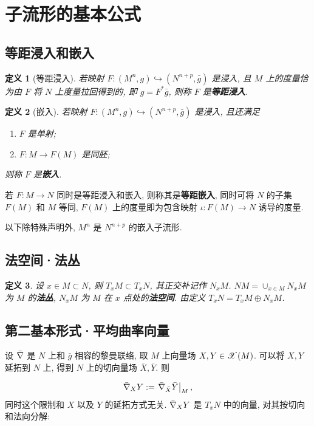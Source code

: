 \documentclass{ctexart}
\newtheorem{definition}{定义}
\begin{document}
\section{子流形的基本公式}
\subsection{等距浸入和嵌入}
\begin{definition}[等距浸入]
	若映射 $F\colon (M^n, g) \hookrightarrow (N^{n + p}, \bar{g})$ 是浸入, 且 $M$ 上的度量恰为由 $F$ 将 $N$ 上度量拉回得到的, 即 $g = F^{\ast}\bar{g}$, 则称 $F$ 是{\bf 等距浸入}.
\end{definition}

\begin{definition}[嵌入]
	若映射 $F\colon (M^n, g) \hookrightarrow (N^{n + p}, \bar{g})$ 是浸入, 且还满足
	\begin{enumerate}
		\item $F$ 是单射;
		\item $F\colon M \rightarrow F(M)$ 是同胚;
	\end{enumerate}
	则称 $F$ 是{\bf 嵌入}.
\end{definition}

若 $F \colon M \rightarrow N$ 同时是等距浸入和嵌入, 则称其是{\bf 等距嵌入}, 同时可将 $N$ 的子集 $F(M)$ 和 $M$ 等同, $F(M)$ 上的度量即为包含映射 $\iota \colon F(M) \rightarrow N$ 诱导的度量.

以下除特殊声明外, $M^n$ 是 $N^{n + p}$ 的嵌入子流形.

\subsection{法空间·法丛}
\begin{definition}
	设 $x \in M \subset N$, 则 $T_xM \subset T_xN$, 其正交补记作 $N_xM$. $NM = \cup_{x \in M}N_xM$ 为 $M$ 的{\bf 法丛}, $N_xM$ 为 $M$ 在 $x$ 点处的{\bf 法空间}. 由定义 $T_xN = T_x{M} \oplus N_xM$.
\end{definition}

\subsection{第二基本形式·平均曲率向量}
设 $\bar{\nabla}$ 是 $N$ 上和 $\bar{g}$ 相容的黎曼联络, 取 $M$ 上向量场 $X, Y \in \mathscr{X}(M)$. 可以将 $X, Y$ 延拓到 $N$ 上, 得到 $N$ 上的切向量场 $\bar{X}, \bar{Y}$. 则

\begin{equation}\label{eq::restriction-of-bar-nabla}
	\bar{\nabla}_{X}Y := \left.\bar{\nabla}_{\bar{X}}\bar{Y}\right|_{M},
\end{equation}
同时这个限制和 $X$ 以及 $Y$ 的延拓方式无关. $\bar{\nabla}_{X}Y$ 是 $T_xN$ 中的向量, 对其按切向和法向分解:
\end{document}
